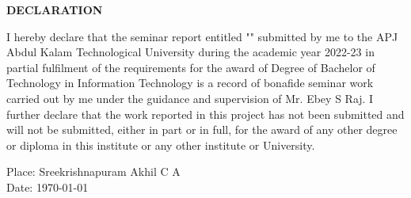\begin{titlepage}
\begin{center}
    \large{\textbf{DECLARATION}}
\end{center}

\noindent I hereby declare that the seminar report entitled "{\textbf{\cTitle}}" submitted by me to the APJ Abdul Kalam Technological University during the academic year 2022-23 in partial fulfilment of the requirements for the award of Degree of Bachelor of Technology in Information Technology is a record of bonafide seminar work carried out by me under the guidance and supervision of Mr. Ebey S Raj. I further declare that the work reported in this project has not been submitted and will not be submitted, either in part or in full, for the award of any other degree or diploma in this institute or any other institute or University.

\vspace{2cm}

\noindent Place: Sreekrishnapuram \hfill Akhil C A\\
Date: \today \hfill  \cRegNo

\end{titlepage}